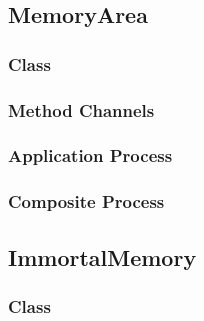 \documentclass{article}
\begin{document}
\subsection{MemoryArea}

\subsubsection{{\OhCircus} Class}
\vspace{-0.5em}

\begin{circusbox}

\end{circusbox}

\subsubsection{Method Channels}
\vspace{-0.5em}

\begin{circusbox}

\end{circusbox}

\subsubsection{Application Process}
\vspace{-0.5em}

\begin{circusbox}

\end{circusbox}

\subsubsection{Composite Process}
\vspace{-0.5em}

\begin{circusbox}

\end{circusbox}

\subsection{ImmortalMemory}

\subsubsection{{\OhCircus} Class}
\vspace{-0.5em}
\end{document}
